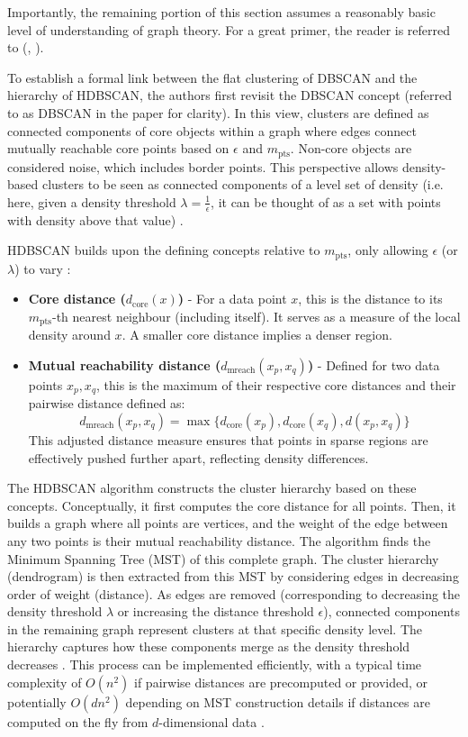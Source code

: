 \documentclass[10pt,oneside]{report}
\renewcommand{\citet}[1]{\citeauthor{#1}, \citeyear{#1}}
\begin{document}
Importantly, the remaining portion of this section assumes a reasonably basic level of understanding of graph theory. For a great primer, the reader is referred to (\citet{harris2008combinatorics}).

To establish a formal link between the flat clustering of DBSCAN and the hierarchy of HDBSCAN, the authors first revisit the DBSCAN concept (referred to as DBSCAN\* in the paper for clarity). In this view, clusters are defined as connected components of core objects within a graph where edges connect mutually reachable core points based on $\epsilon$ and $m_{\text{pts}}$. Non-core objects are considered noise, which includes border points. This perspective allows density-based clusters to be seen as connected components of a level set of density (i.e. here, given a density threshold $\lambda = \frac 1 \epsilon$, it can be thought of as a set with points with density above that value) \cite{campello2013density}.

HDBSCAN builds upon the defining concepts relative to $m_{\text{pts}}$, only allowing $\epsilon$ (or $\lambda$) to vary \cite{campello2013density}:
\begin{itemize}
    \item \textbf{Core distance ($d_{\text{core}}(x)$)} - For a data point $x$, this is the distance to its $m_{\text{pts}}$-th nearest neighbour (including itself). It serves as a measure of the local density around $x$. A smaller core distance implies a denser region.
    \item \textbf{Mutual reachability distance ($d_{\text{mreach}}(x_p, x_q)$)} - Defined for two data points $x_p, x_q$, this is the maximum of their respective core distances and their pairwise distance defined as:
        \[d_{\text{mreach}}(x_p, x_q) = \max \{ d_{\text{core}}(x_p), d_{\text{core}}(x_q), d(x_p, x_q) \}\]
    This adjusted distance measure ensures that points in sparse regions are effectively pushed further apart, reflecting density differences.
\end{itemize}

The HDBSCAN algorithm constructs the cluster hierarchy based on these concepts. Conceptually, it first computes the core distance for all points. Then, it builds a graph where all points are vertices, and the weight of the edge between any two points is their mutual reachability distance. The algorithm finds the Minimum Spanning Tree (MST) of this complete graph. The cluster hierarchy (dendrogram) is then extracted from this MST by considering edges in decreasing order of weight (distance). As edges are removed (corresponding to decreasing the density threshold $\lambda$ or increasing the distance threshold $\epsilon$), connected components in the remaining graph represent clusters at that specific density level. The hierarchy captures how these components merge as the density threshold decreases \cite{campello2013density}. This process can be implemented efficiently, with a typical time complexity of $O(n^2)$ if pairwise distances are precomputed or provided, or potentially $O(dn^2)$ depending on MST construction details if distances are computed on the fly from $d$-dimensional data \cite{campello2013density}.
\end{document}
